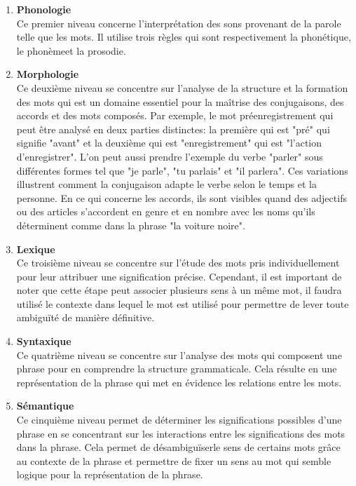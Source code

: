 \documentclass{rapport}
\begin{document}
\begin{enumerate}[listparindent=0pt, parsep=0pt]

    \item \textbf{Phonologie}\\
    Ce premier niveau concerne l'interprétation des sons provenant de la parole telle que les mots. Il utilise trois règles qui sont respectivement la phonétique\footnotemark[1], le phonème\footnotemark[2] et la prosodie\footnotemark[3].\\

    \item \textbf{Morphologie}\\
    Ce deuxième niveau se concentre sur l'analyse de la structure et la formation des mots qui est un domaine essentiel pour la maîtrise des conjugaisons, des accords et des mots composés. Par exemple, le mot préenregistrement qui peut être analysé en deux parties distinctes: la première qui est "pré" qui signifie "avant" et la deuxième qui est "enregistrement" qui est "l'action d'enregistrer". L'on peut aussi prendre l'exemple du verbe "parler" sous différentes formes tel que "je parle", "tu parlais" et "il parlera". Ces variations illustrent comment la conjugaison adapte le verbe selon le temps et la personne. En ce qui concerne les accords, ils sont visibles quand des adjectifs ou des articles s'accordent en genre et en nombre avec les noms qu'ils déterminent comme dans la phrase "la voiture noire".\\
    
    \item \textbf{Lexique}\\
    Ce troisième niveau se concentre sur l'étude des mots pris individuellement pour leur attribuer une signification précise. Cependant, il est important de noter que cette étape peut associer plusieurs sens à un même mot, il faudra utilisé le contexte dans lequel le mot est utilisé pour permettre de lever toute ambiguïté de manière définitive.\\

    \item \textbf{Syntaxique}\\
    Ce quatrième niveau se concentre sur l'analyse des mots qui composent une phrase pour en comprendre la structure grammaticale. Cela résulte en une représentation de la phrase qui met en évidence les relations entre les mots.\\

    \item \textbf{Sémantique}\\
    Ce cinquième niveau permet de déterminer les significations possibles d'une phrase en se concentrant sur les interactions entre les significations des mots dans la phrase. Cela permet de désambiguïser\footnotemark[4] le sens de certains mots grâce au contexte de la phrase et permettre de fixer un sens au mot qui semble logique pour la représentation de la phrase.\\
    

\end{enumerate}
\end{document}
